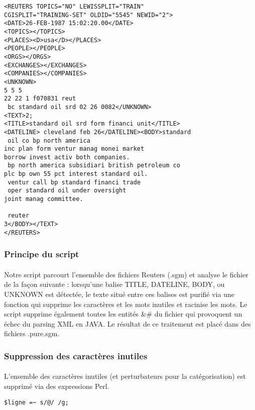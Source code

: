 \lstset{language=XML}
\begin{lstlisting}
<REUTERS TOPICS="NO" LEWISSPLIT="TRAIN" 
CGISPLIT="TRAINING-SET" OLDID="5545" NEWID="2">
<DATE>26-FEB-1987 15:02:20.00</DATE>
<TOPICS></TOPICS>
<PLACES><D>usa</D></PLACES>
<PEOPLE></PEOPLE>
<ORGS></ORGS>
<EXCHANGES></EXCHANGES>
<COMPANIES></COMPANIES>
<UNKNOWN> 
5 5 5 
22 22 1 f070831 reut
 bc standard oil srd 02 26 0082</UNKNOWN>
<TEXT>2;
<TITLE>standard oil srd form financi unit</TITLE>
<DATELINE> cleveland feb 26</DATELINE><BODY>standard
 oil co bp north america
inc plan form ventur manag monei market
borrow invest activ both companies.
 bp north america subsidiari british petroleum co
plc bp own 55 pct interest standard oil.
 ventur call bp standard financi trade
 oper standard oil under oversight 
joint manag committee.

 reuter
3</BODY></TEXT>
</REUTERS>
\end{lstlisting}

\subsubsection{Principe du script}
\paragraph{}
Notre script parcourt l'ensemble des fichiers Reuters (.sgm) et analyse le fichier de la façon suivante : lorsqu'une balise TITLE, DATELINE, BODY, ou UNKNOWN est détectée, le texte situé entre ces balises est purifié via une fonction qui supprime les caractères et les mots inutiles et racinise les mots. Le script supprime également toutes les entités \&\# du fichier qui provoquent un échec du parsing XML en JAVA. Le résultat de ce traitement est placé dans des fichiers .pure.sgm.

\subsubsection{Suppression des caractères inutiles}
\paragraph{}
L'ensemble des caractères inutiles (et perturbateurs pour la catégorisation) est supprimé via des expressions  Perl.

\lstset{language=Perl}
\begin{lstlisting}
$ligne =~ s/@/ /g;
\end{lstlisting}

